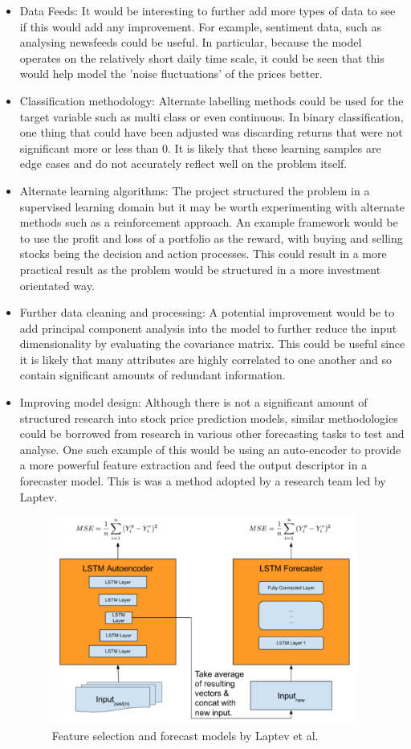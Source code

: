 \documentclass[10pt,onecolumn,letterpaper]{article}
\begin{document}
\begin{itemize}
	\item Data Feeds: It would be interesting to further add more types of data to see if this would add any improvement. For example, sentiment data, such as analysing newsfeeds could be useful. In particular, because the model operates on the relatively short daily time scale, it could be seen that this would help model the 'noise fluctuations' of the prices better. 
	\item Classification methodology: Alternate labelling methods could be used for the target variable such as multi class or even continuous. In binary classification, one thing that could have been adjusted was discarding returns that were not significant more or less than 0. It is likely that these learning samples are edge cases and do not accurately reflect well on the problem itself.
	\item Alternate learning algorithms: The project structured the problem in a supervised learning domain but it may be worth experimenting with alternate methods such as a reinforcement approach. An example framework would be to use the profit and loss of a portfolio as the reward, with buying and selling stocks being the decision and action processes. This could result in a more practical result as the problem would be structured in a more investment orientated way.
	\item Further data cleaning and processing: A potential improvement would be to add principal component analysis into the model to further reduce the input dimensionality by evaluating the covariance matrix. This could be useful since it is likely that many attributes are highly correlated to one another and so contain significant amounts of redundant information.
	\item Improving model design: Although there is not a significant amount of structured research into stock price prediction models, similar methodologies could be borrowed from research in various other forecasting tasks to test and analyse. One such example of this would be using an auto-encoder to provide a more powerful feature extraction and feed the output descriptor in a forecaster model. This is was a method adopted by a research team led by Laptev\cite{Laptev}.  
	
\begin{figure}[!hbt!]
\centering
\includegraphics[width=10cm]{uber_architecture}
\caption{Feature selection and forecast models by Laptev et al.}
\end{figure}
\end{itemize}
\end{document}
